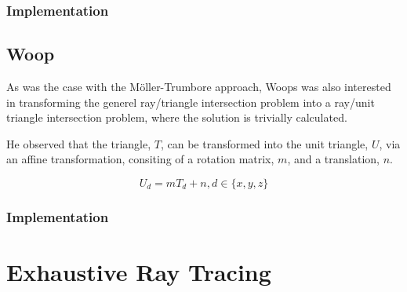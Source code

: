 \subsubsection{Implementation}


\subsection{Woop}


As was the case with the Möller-Trumbore approach, Woops was also
interested in transforming the generel ray/triangle intersection
problem into a ray/unit triangle intersection problem, where the
solution is trivially calculated.

He observed that the triangle, $T$, can be transformed into the unit
triangle, $U$, via an affine transformation, consiting of a rotation
matrix, $m$, and a translation, $n$.

\begin{displaymath}
  U_d = m T_d + n, d \in \{x, y, z\}
\end{displaymath}



\subsubsection{Implementation}





\section{Exhaustive Ray Tracing}



